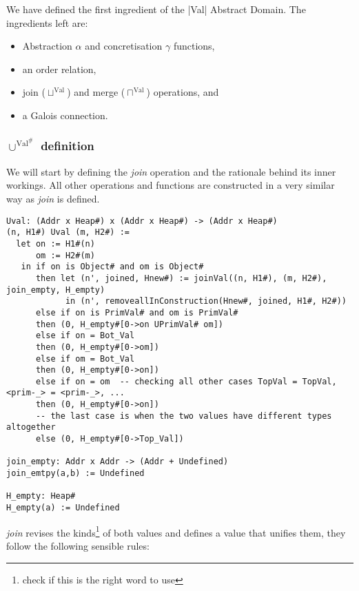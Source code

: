 We have defined the first ingredient of the \pycode|Val| Abstract
Domain. The ingredients left are:

\begin{itemize}
\tightlist
\item
  Abstraction \(\alpha{}\) and concretisation \(\gamma{}\) functions,
\item
  an order relation,
\item
  join (\(\sqcup^{\text{Val}}\)) and merge (\(\sqcap^{\text{Val}}\))
  operations, and
\item
  a Galois connection.
\end{itemize}

\subsubsection*{\(\cup^{\text{Val}^\#}\) definition}

We will start by defining the \emph{join} operation and the
rationale behind its inner workings. All other operations and functions
are constructed in a very similar way as \emph{join} is defined.

\begin{verbatim}
Uval: (Addr x Heap#) x (Addr x Heap#) -> (Addr x Heap#)
(n, H1#) Uval (m, H2#) :=
  let on := H1#(n)
      om := H2#(m)
   in if on is Object# and om is Object#
      then let (n', joined, Hnew#) := joinVal((n, H1#), (m, H2#), join_empty, H_empty)
            in (n', removeallInConstruction(Hnew#, joined, H1#, H2#))
      else if on is PrimVal# and om is PrimVal#
      then (0, H_empty#[0->on UPrimVal# om])
      else if on = Bot_Val
      then (0, H_empty#[0->om])
      else if om = Bot_Val
      then (0, H_empty#[0->on])
      else if on = om  -- checking all other cases TopVal = TopVal, <prim-_> = <prim-_>, ...
      then (0, H_empty#[0->on])
      -- the last case is when the two values have different types altogether
      else (0, H_empty#[0->Top_Val])

join_empty: Addr x Addr -> (Addr + Undefined)
join_emtpy(a,b) := Undefined

H_empty: Heap#
H_empty(a) := Undefined
\end{verbatim}

\emph{join} revises the kinds\footnote{check if this is the right word
  to use} of both values and defines a value that unifies them, they
follow the following sensible rules:

